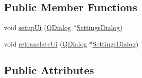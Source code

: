 \subsection*{Public Member Functions}
\begin{DoxyCompactItemize}
\item 
void \hyperlink{a00029_a4666ab89748eeb11cdb95d857bd02c6e}{setup\+Ui} (\hyperlink{a00009}{Q\+Dialog} $\ast$\hyperlink{a00022}{Settings\+Dialog})
\item 
void \hyperlink{a00029_a7a0adf32eef516ceffcc0633a90c3b34}{retranslate\+Ui} (\hyperlink{a00009}{Q\+Dialog} $\ast$\hyperlink{a00022}{Settings\+Dialog})
\end{DoxyCompactItemize}
\subsection*{Public Attributes}
